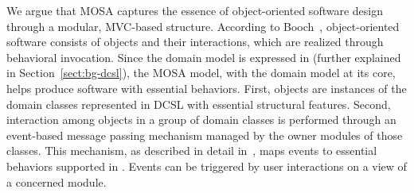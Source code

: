 We argue that MOSA captures the essence of object-oriented software design through a modular, MVC-based structure. According to Booch~\cite{booch_object-oriented_1986}, object-oriented software consists of objects and their interactions, which are realized through behavioral invocation. Since the domain model is expressed in \dcsl (further explained in Section~\ref{sect:bg-dcsl}), the MOSA model, with the domain model at its core, helps produce software with essential behaviors. First, objects are instances of the domain classes represented in DCSL with essential structural features. Second, interaction among objects in a group of domain classes is performed through an event-based message passing mechanism managed by the owner modules of those classes. This mechanism, as described in detail in~\cite{le_jdomainapp_2017}, maps events to essential behaviors supported in \dcsl. Events can be triggered by user interactions on a view of a concerned module.

